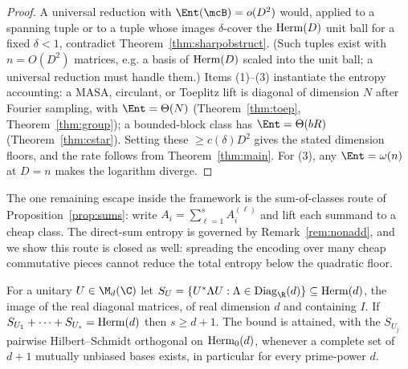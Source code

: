 \begin{proof}
A universal reduction with $\Ent(\mcB)=o(D^2)$ would, applied to a spanning tuple
or to a tuple whose images $\delta$-cover the $\mathrm{Herm}(D)$ unit ball for a fixed
$\delta<1$, contradict Theorem~\ref{thm:sharpobstruct}. (Such tuples exist with
$n=O(D^2)$ matrices, e.g. a basis of $\mathrm{Herm}(D)$ scaled into the unit ball; a
universal reduction must handle them.) Items (1)--(3) instantiate the entropy
accounting: a MASA, circulant, or Toeplitz lift is diagonal of dimension $N$ after
Fourier sampling, with $\Ent=\Theta(N)$ (Theorem~\ref{thm:toep},
Theorem~\ref{thm:group}); a bounded-block class has $\Ent=\Theta(bR)$
(Theorem~\ref{thm:cstar}). Setting these $\ge c(\delta)D^2$ gives the stated
dimension floors, and the rate follows from Theorem~\ref{thm:main}. For (3), any
$\Ent=\omega(n)$ at $D=n$ makes the logarithm diverge.
\end{proof}

The one remaining escape inside the framework is the sum-of-classes route of
Proposition~\ref{prop:sums}: write $A_i=\sum_{\ell=1}^s A_i^{(\ell)}$ and lift each
summand to a cheap class. The direct-sum entropy is governed by
Remark~\ref{rem:nonadd}, and we show this route is closed as well: spreading the
encoding over many cheap commutative pieces cannot reduce the total entropy below
the quadratic floor.

\begin{lemma}
\label{lem:mubspan}
For a unitary $U\in\M_d(\C)$ let $S_U=\{U^*\Lambda U:\Lambda\in\Diag_\R(d)\}\subseteq\Herm(d)$,
the image of the real diagonal matrices, of real dimension $d$ and containing $I$.
If $S_{U_1}+\cdots+S_{U_s}=\mathrm{Herm}(d)$ then $s\ge d+1$. The bound is attained, with
the $S_{U_j}$ pairwise Hilbert--Schmidt orthogonal on $\mathrm{Herm}_0(d)$, whenever a
complete set of $d+1$ mutually unbiased bases exists, in particular for every
prime-power $d$.
\end{lemma}

